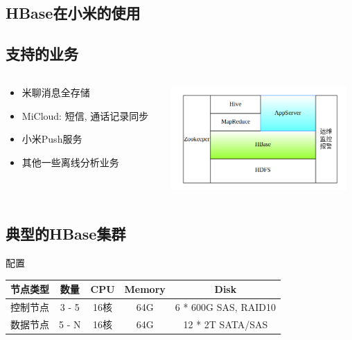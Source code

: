 \documentclass[xcolor=table]{beamer}
\begin{document}
\begin{CJK}{UTF8}{gkai}

\section{HBase在小米的使用}
\subsection{支持的业务}
\begin{frame}{\subsecname}
\begin{columns}
	\begin{column}{0.55\textwidth}
		\begin{itemize}
			\item 米聊消息全存储
			\item MiCloud: 短信, 通话记录同步
			\item 小米Push服务
			\item 其他一些离线分析业务
		\end{itemize}
	\end{column}
	\begin{column}{0.45\textwidth}
		\includegraphics[width=\textwidth, height=4cm]{stack.png}
	\end{column}
\end{columns}
\end{frame}

\subsection{典型的HBase集群}
\begin{frame}{\subsecname}
配置 \\
\bigskip
\begin{tabular}{|c|c|c|c|c|}
	\rowcolor{gray!50}
	\hline
	 节点类型 & 数量		& CPU  & Memory & Disk \\
	\hline
	控制节点 & 3 - 5	& 16核 & 64G    & 6 * 600G SAS, RAID10\\
	\hline
	数据节点 & 5 - N	& 16核 & 64G    & 12 * 2T SATA/SAS \\
	\hline
\end{tabular}  
\end{frame}


\end{CJK}
\end{document}
